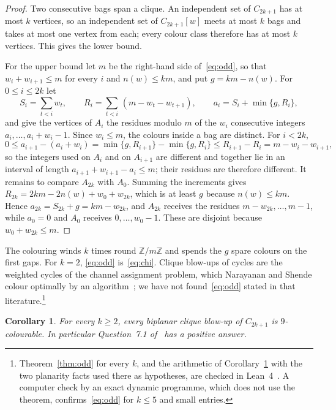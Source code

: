 \documentclass[11pt]{amsart}
\newtheorem{corollary}[theorem]{Corollary}
\theoremstyle{definition}
\theoremstyle{remark}
\numberwithin{equation}{section}
\newcommand{\Z}{\mathbb{Z}}
\begin{document}
\begin{proof}
Two consecutive bags span a clique. An independent set of $C_{2k+1}$ has at most $k$ vertices, so an independent set of $C_{2k+1}[w]$ meets at most $k$ bags and takes at most one vertex from each; every colour class therefore has at most $k$ vertices. This gives the lower bound.

For the upper bound let $m$ be the right-hand side of~\eqref{eq:odd}, so that $w_i+w_{i+1}\le m$ for every $i$ and $n(w)\le km$, and put $g=km-n(w)$. For $0\le i\le 2k$ let
\[
S_i=\sum_{t<i}w_t,\qquad R_i=\sum_{t<i}\,(m-w_t-w_{t+1}),\qquad a_i=S_i+\min\{g,R_i\},
\]
and give the vertices of $A_i$ the residues modulo $m$ of the $w_i$ consecutive integers $a_i,\dots,a_i+w_i-1$. Since $w_i\le m$, the colours inside a bag are distinct. For $i<2k$,
\[
0\le a_{i+1}-(a_i+w_i)=\min\{g,R_{i+1}\}-\min\{g,R_i\}\le R_{i+1}-R_i=m-w_i-w_{i+1},
\]
so the integers used on $A_i$ and on $A_{i+1}$ are different and together lie in an interval of length $a_{i+1}+w_{i+1}-a_i\le m$; their residues are therefore different. It remains to compare $A_{2k}$ with $A_0$. Summing the increments gives $R_{2k}=2km-2n(w)+w_0+w_{2k}$, which is at least $g$ because $n(w)\le km$. Hence $a_{2k}=S_{2k}+g=km-w_{2k}$, and $A_{2k}$ receives the residues $m-w_{2k},\dots,m-1$, while $a_0=0$ and $A_0$ receives $0,\dots,w_0-1$. These are disjoint because $w_0+w_{2k}\le m$.
\end{proof}

The colouring winds $k$ times round $\Z/m\Z$ and spends the $g$ spare colours on the first gaps. For $k=2$, \eqref{eq:odd} is~\eqref{eq:chi}. Clique blow-ups of cycles are the weighted cycles of the channel assignment problem, which Narayanan and Shende colour optimally by an algorithm~\cite{NS}; we have not found~\eqref{eq:odd} stated in that literature.\footnote{Theorem~\ref{thm:odd} for every $k$, and the arithmetic of Corollary~\ref{cor:odd} with the two planarity facts used there as hypotheses, are checked in Lean~4~\cite{Ar}. A computer check by an exact dynamic programme, which does not use the theorem, confirms~\eqref{eq:odd} for $k\le5$ and small entries.}

\begin{corollary}\label{cor:odd}
For every $k\ge2$, every biplanar clique blow-up of $C_{2k+1}$ is $9$-colourable. In particular Question~7.1 of~\cite{Tr} has a positive answer.
\end{corollary}
\end{document}

